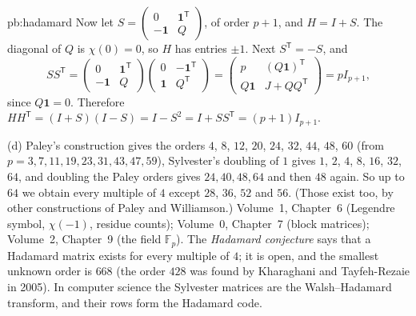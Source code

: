 \begin{solution}{pb:hadamard}
Now let $S=\begin{pmatrix}0&\mathbf1^{\mathsf T}\\-\mathbf1&Q\end{pmatrix}$, of order $p+1$, and $H=I+S$. The diagonal of
$Q$ is $\chi(0)=0$, so $H$ has entries $\pm1$. Next $S^{\mathsf T}=-S$, and
\[
SS^{\mathsf T}=\begin{pmatrix}0&\mathbf1^{\mathsf T}\\-\mathbf1&Q\end{pmatrix}\begin{pmatrix}0&-\mathbf1^{\mathsf T}\\
\mathbf1&Q^{\mathsf T}\end{pmatrix}=\begin{pmatrix}p&(Q\mathbf1)^{\mathsf T}\\Q\mathbf1&J+QQ^{\mathsf T}\end{pmatrix}=pI_{p+1},
\]
since $Q\mathbf1=0$. Therefore $HH^{\mathsf T}=(I+S)(I-S)=I-S^2=I+SS^{\mathsf T}=(p+1)I_{p+1}$.

(d) Paley's construction gives the orders $4$, $8$, $12$, $20$, $24$, $32$, $44$, $48$, $60$ (from $p=3,7,11,19,23,31,43,47,59$), Sylvester's doubling
of $1$ gives $1$, $2$, $4$, $8$, $16$, $32$, $64$, and doubling the Paley orders gives $24,40,48,64$ and then $48$ again. So up to $64$ we obtain
every multiple of $4$ except $28$, $36$, $52$ and $56$. (Those exist too, by other constructions of Paley and Williamson.)
\tools Volume~1, Chapter~6 (Legendre symbol, $\chi(-1)$, residue counts); Volume~0, Chapter~7 (block matrices); Volume~2,
Chapter~9 (the field $\mathbb F_p$).
\leads The \emph{Hadamard conjecture} says that a Hadamard matrix exists for every multiple of $4$; it is open, and the
smallest unknown order is $668$ (the order $428$ was found by Kharaghani and Tayfeh-Rezaie in 2005). In computer science the
Sylvester matrices are the Walsh--Hadamard transform, and their rows form the Hadamard code.
\end{solution}


